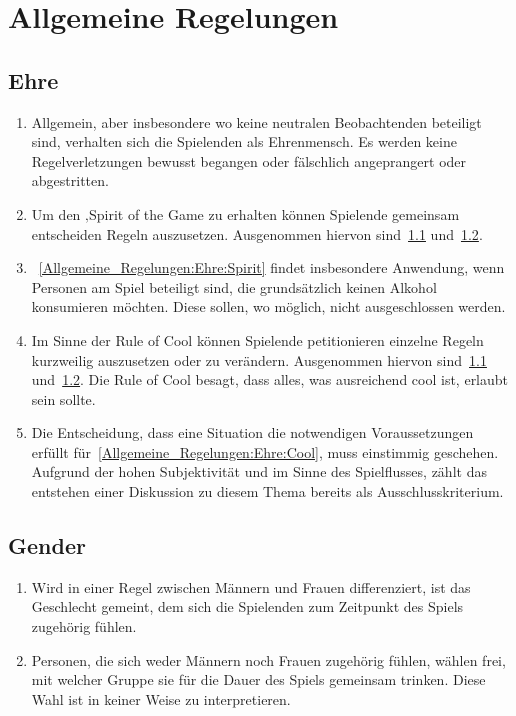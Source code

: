 \chapter{Allgemeine Regelungen}\label{Allgemeine_Regelungen}

\section{Ehre}\label{Allgemeine_Regelungen:Ehre}
\begin{enumerate}[label={(\arabic*)}]
	\item Allgemein, aber insbesondere wo keine neutralen Beobachtenden beteiligt sind, verhalten sich die Spielenden als Ehrenmensch.
	Es werden keine Regelverletzungen bewusst begangen oder fälschlich angeprangert oder abgestritten.
	
	\item\label{Allgemeine_Regelungen:Ehre:Spirit}
	Um den \glqq{}‚Spirit of the Game\grqq{} zu erhalten können Spielende gemeinsam entscheiden Regeln auszusetzen.
	Ausgenommen hiervon sind~\ref{Allgemeine_Regelungen:Ehre} und~\ref{Allgemeine_Regelungen:Gender}.
	
	\item
~\ref{Allgemeine_Regelungen:Ehre:Spirit} findet insbesondere Anwendung, wenn Personen am Spiel beteiligt sind, die grundsätzlich keinen Alkohol konsumieren möchten.
	Diese sollen, wo möglich, nicht ausgeschlossen werden.
	
	\item\label{Allgemeine_Regelungen:Ehre:Cool}
	Im Sinne der \glqq{}Rule of Cool\grqq{} können Spielende petitionieren einzelne Regeln kurzweilig auszusetzen oder zu verändern.
	Ausgenommen hiervon sind~\ref{Allgemeine_Regelungen:Ehre} und~\ref{Allgemeine_Regelungen:Gender}.
	Die Rule of Cool besagt, dass alles, was ausreichend cool ist, erlaubt sein sollte.

	\item
	Die Entscheidung, dass eine Situation die notwendigen Voraussetzungen erfüllt für~\ref{Allgemeine_Regelungen:Ehre:Cool}, muss einstimmig geschehen.
	Aufgrund der hohen Subjektivität und im Sinne des Spielflusses, zählt das entstehen einer Diskussion zu diesem Thema bereits als Ausschlusskriterium.
\end{enumerate}

\section{Gender}\label{Allgemeine_Regelungen:Gender}
\begin{enumerate}[label={(\arabic*)}]	
	\item
	Wird in einer Regel zwischen Männern und Frauen differenziert, ist das Geschlecht gemeint, dem sich die Spielenden zum Zeitpunkt des Spiels zugehörig fühlen.
	
	\item
	Personen, die sich weder Männern noch Frauen zugehörig fühlen, wählen frei, mit welcher Gruppe sie für die Dauer des Spiels gemeinsam trinken.
	Diese Wahl ist in keiner Weise zu interpretieren.
\end{enumerate}
	
